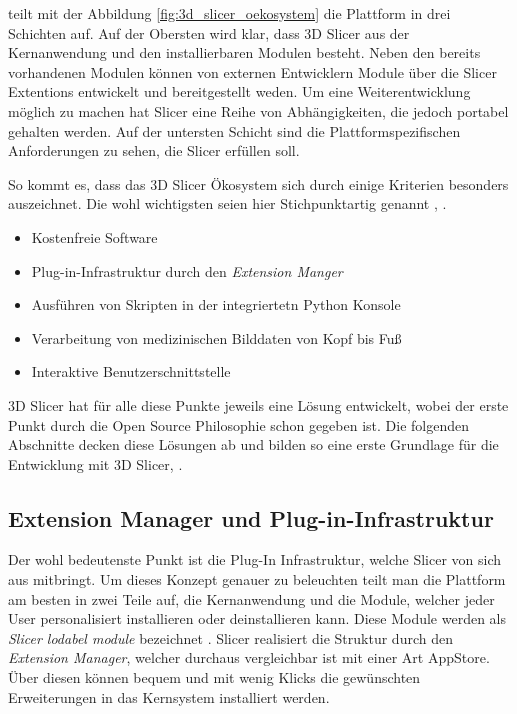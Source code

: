 \citet[Seite 1326]{fedorov2012slicer} teilt mit der Abbildung \ref{fig:3d_slicer_oekosystem}
die Plattform in drei Schichten auf. Auf der Obersten wird klar, dass 3D Slicer aus
der Kernanwendung und den installierbaren Modulen besteht. Neben den bereits
vorhandenen Modulen können von externen Entwicklern Module über die Slicer
Extentions entwickelt und bereitgestellt weden. Um eine Weiterentwicklung möglich
zu machen hat Slicer eine Reihe von Abhängigkeiten, die jedoch portabel gehalten
werden. Auf der untersten Schicht sind die Plattformspezifischen Anforderungen zu
sehen, die Slicer erfüllen soll.

So kommt es, dass das 3D Slicer Ökosystem sich durch einige Kriterien besonders auszeichnet.
Die wohl wichtigsten seien hier Stichpunktartig genannt \citep[vgl.][]{slicer2024},
\citep[vgl.][]{fedorov2012slicer}.

\begin{itemize}
	\item Kostenfreie Software

	\item Plug-in-Infrastruktur durch den \textit{Extension Manger}

	\item Ausführen von Skripten in der integriertetn Python Konsole

	\item Verarbeitung von medizinischen Bilddaten von Kopf bis Fuß

	\item Interaktive Benutzerschnittstelle
\end{itemize}

3D Slicer hat für alle diese Punkte jeweils eine Lösung entwickelt, wobei der erste
Punkt durch die Open Source Philosophie schon gegeben ist. Die folgenden
Abschnitte decken diese Lösungen ab und bilden so eine erste Grundlage für die
Entwicklung mit 3D Slicer\citep[vgl.][]{slicer2024}, \citep[vgl.][]{fedorov2012slicer}.

\subsection{Extension Manager und Plug-in-Infrastruktur}
Der wohl bedeutenste Punkt ist die Plug-In Infrastruktur, welche Slicer von sich
aus mitbringt. Um dieses Konzept genauer zu beleuchten teilt man die Plattform
am besten in zwei Teile auf, die Kernanwendung und die Module, welcher jeder
User personalisiert installieren oder deinstallieren kann. Diese Module werden als
\textit{Slicer lodabel module} bezeichnet \citep[vgl.][Seite 1332]{fedorov2012slicer}.
Slicer realisiert die Struktur durch den \textit{Extension Manager}, welcher durchaus
vergleichbar ist mit einer Art AppStore. Über diesen können bequem und mit wenig
Klicks die gewünschten Erweiterungen in das Kernsystem installiert werden.

